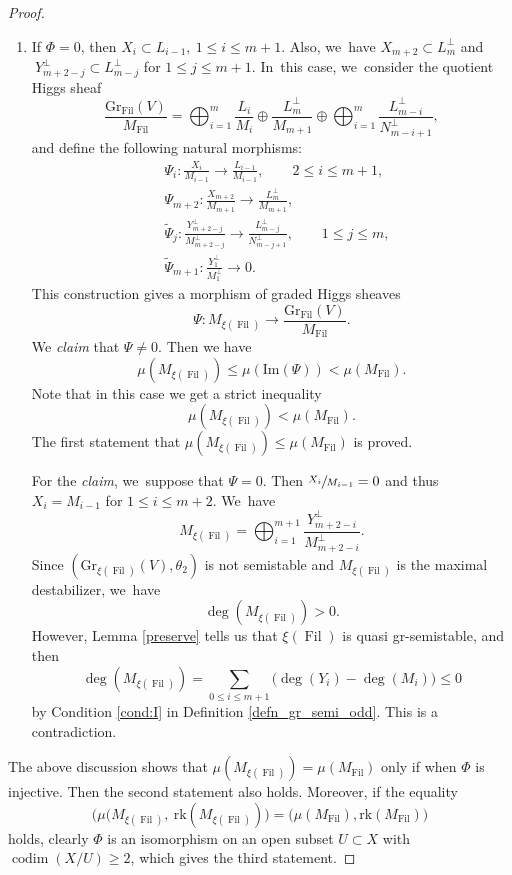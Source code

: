 \documentclass[JEP,XML,SOM,Unicode,published]{cedram}
\newcommand{\grsemistable}{gr\nobreakdash-semi\-stable\xspace}
\DeclareMathOperator{\codim}{codim}
\DeclareMathOperator{\Filt}{Fil}
\newcommand{\rk}{\mathrm{rk}}
\newcommand{\Gr}{\mathrm{Gr}}
\theoremstyle{plain}
\theoremstyle{definition}
\begin{document}
\begin{proof}
\begin{enumerate}
\item If $\Phi= 0$, then $X_i\subset L_{i-1},\ 1\leq i\leq m+1$. Also, we~have $X_{m+2}\subset L_{m}^\perp$ and $\ Y_{m+2-j}^\perp \subset L_{m-j}^\perp$ for $1\leq j\leq m+1$. In~this case, we~consider the quotient Higgs sheaf
\[
\frac{\Gr_{\Filt}(V)}{M_{\Filt}}=\mathop{\bigoplus}_{i=1}^{m} \frac{L_i}{M_i}\oplus \frac{L_m^\perp}{M_{m+1}}\oplus \mathop{\bigoplus}_{i=1}^{m} \frac{L_{m-i}^\perp}{N_{m-i+1}^\perp},
\]
and define the following natural morphisms:
\begin{equation}
\begin{split}
&\Psi_i:\frac{X_i}{M_{i-1}}\to \frac{L_{i-1}}{M_{i-1}},\qquad 2\leq i\leq m+1,\\
&\Psi_{m+2}:\frac{X_{m+2}}{M_{m+1}}\to \frac{L_m^\perp}{M_{m+1}},\\
&\tilde{\Psi}_j:\frac{Y_{m+2-j}^\perp}{M_{m+2-j}^\perp}\to \frac{L_{m-j}^\perp}{N_{m-j+1}^\perp},\qquad 1\leq j\leq m,\\
&\tilde{\Psi}_{m+1}:\frac{Y_1^\perp}{M_1^\perp}\to 0.
\end{split}
\end{equation}
This construction gives a morphism of graded Higgs sheaves
\[
\Psi: M_{\xi(\Filt)}\to \frac{\Gr_{\Filt}(V)}{M_{\Filt}}.
\]
We \emph{claim} that $\Psi\neq 0$. Then we have
\[
\mu(M_{\xi(\Filt)})\leq \mu(\mathrm{Im}(\Psi)) <\mu(M_{\Filt}).
\]
Note that in this case we get a strict inequality
\[
\mu(M_{\xi(\Filt)})<\mu(M_{\Filt}).
\]
The first statement that $\mu(M_{\xi(\Filt)})\leq \mu(M_{\Filt})$ is proved.

For the \emph{claim}, we~suppose that $\Psi=0$. Then $\sfrac{X_i}{M_{i-1}}=0$ and thus $X_i = M_{i-1}$ for $1 \leq i \leq m+2$. We~have
\[
M_{\xi(\Filt)}=\mathop{\bigoplus}_{i=1}^{m+1} \frac{Y_{m+2-i}^\perp}{M_{m+2-i}^\perp}.
\]
Since $(\Gr_{\xi(\Filt)}(V), \theta_2)$ is not semistable and $M_{\xi(\Filt)}$ is the maximal destabilizer, we~have
\[
\deg(M_{\xi(\Filt)})>0.
\]
However, Lemma \ref{preserve} tells us that $\xi(\Filt)$ is quasi \grsemistable, and then
\begin{equation*}
\deg(M_{\xi(\Filt)})=\sum_{0\leq i\leq m+1}\big(\deg(Y_i)-\deg(M_i)\big)\leq 0
\end{equation*}
by Condition \eqref{cond:I} in Definition \ref{defn_gr_semi_odd}. This is a contradiction.
\end{enumerate}

The above discussion shows that $\mu(M_{\xi(\Filt)})= \mu(M_{\Filt})$ only if when $\Phi$ is injective. Then the second statement also holds. Moreover, if the equality
\[
\big(\mu(M_{\xi(\Filt)},\ \rk(M_{\xi(\Filt)})\big)= \big(\mu(M_{\Filt}),\rk(M_{\Filt})\big)
\]
holds, clearly $\Phi$ is an isomorphism on an open subset $U \subset X$ with $\codim(X/U) \geq 2$, which gives the third statement.
\end{proof}
\end{document}
